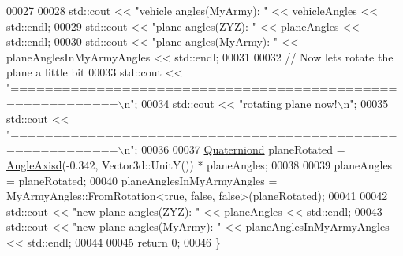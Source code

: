\begin{DoxyCode}
00027   
00028   std::cout << \textcolor{stringliteral}{"vehicle angles(MyArmy):     "} << vehicleAngles << std::endl;
00029   std::cout << \textcolor{stringliteral}{"plane angles(ZYZ):        "} << planeAngles << std::endl;
00030   std::cout << \textcolor{stringliteral}{"plane angles(MyArmy):     "} << planeAnglesInMyArmyAngles << std::endl;
00031   
00032   \textcolor{comment}{// Now lets rotate the plane a little bit}
00033   std::cout << \textcolor{stringliteral}{"==========================================================\(\backslash\)n"};
00034   std::cout << \textcolor{stringliteral}{"rotating plane now!\(\backslash\)n"};
00035   std::cout << \textcolor{stringliteral}{"==========================================================\(\backslash\)n"};
00036   
00037   \hyperlink{group___geometry___module_class_eigen_1_1_quaternion}{Quaterniond} planeRotated = \hyperlink{group___geometry___module_gac218cd8f23b49aa36401d0c843bb6835}{AngleAxisd}(-0.342, Vector3d::UnitY()) * planeAngles;
00038   
00039   planeAngles = planeRotated;
00040   planeAnglesInMyArmyAngles = MyArmyAngles::FromRotation<true, false, false>(planeRotated);
00041   
00042   std::cout << \textcolor{stringliteral}{"new plane angles(ZYZ):     "} << planeAngles << std::endl;
00043   std::cout << \textcolor{stringliteral}{"new plane angles(MyArmy): "} << planeAnglesInMyArmyAngles << std::endl;
00044   
00045   \textcolor{keywordflow}{return} 0;
00046 \}
\end{DoxyCode}
